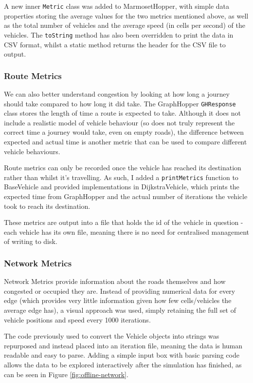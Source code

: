 \documentclass[ %
                    author={Alexander Hill},
                supervisor={Dr. Benjamin Sach},
                    degree={MEng},
                     title={MARMOSET},
                  subtitle={Multi-Agent Route Management using Online Simulation for Efficient Transportation},
                      type={research},
                      year={2016} ]{dissertation}
\begin{document}
A new inner \texttt{Metric} class was added to MarmosetHopper, with simple data
properties storing the average values for the two metrics mentioned above, as
well as the total number of vehicles and the average speed (in cells per second)
of the vehicles. The \texttt{toString} method has also been overridden to print
the data in CSV format, whilst a static method returns the header for the CSV
file to output.

\subsubsection{Route Metrics}

We can also better understand congestion by looking at how long a journey should
take compared to how long it did take. The GraphHopper \texttt{GHResponse} class
stores the length of time a route is expected to take. Although it does not
include a realistic model of vehicle behaviour (so does not truly represent the
correct time a journey would take, even on empty roads), the difference between
expected and actual time is another metric that can be used to compare different
vehicle behaviours.

Route metrics can only be recorded once the vehicle has reached its destination
rather than whilst it's travelling. As such, I added a \texttt{printMetrics}
function to BaseVehicle and provided implementations in DijkstraVehicle, which
prints the expected time from GraphHopper and the actual number of iterations the
vehicle took to reach its destination.

These metrics are output into a file that holds the id of the vehicle in
question - each vehicle has its own file, meaning there is no need for
centralised management of writing to disk.

\subsubsection{Network Metrics}

Network Metrics provide information about the roads themselves and how congested
or occupied they are. Instead of providing numerical data for every edge (which
provides very little information given how few cells/vehicles the average edge
has), a visual approach was used, simply retaining the full set of vehicle
positions and speed every 1000 iterations.

The code previously used to convert the Vehicle objects into strings was
repurposed and instead placed into an iteration file, meaning the data is human
readable and easy to parse. Adding a simple input box with basic parsing code allows the data to be
explored interactively after the simulation has finished, as can be seen in
Figure \ref{fig:offline-network}.
\end{document}
